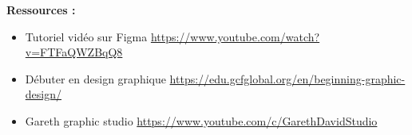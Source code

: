 \textbf{Ressources :}

\begin{itemize}
\item Tutoriel vidéo sur Figma \url{https://www.youtube.com/watch?v=FTFaQWZBqQ8}
\item Débuter en design graphique \url{https://edu.gcfglobal.org/en/beginning-graphic-design/}
\item Gareth graphic studio \url{https://www.youtube.com/c/GarethDavidStudio}
\end{itemize}

